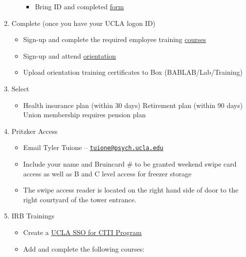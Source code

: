 \documentclass[]{book}
\providecommand{\tightlist}{%
  \setlength{\itemsep}{0pt}\setlength{\parskip}{0pt}}
\begin{document}
\begin{enumerate}
\begin{itemize}
    \begin{itemize}
    \tightlist
    \item
      Bring ID and completed \href{https://secure.bruincard.ucla.edu/BCW/BruinCard_Web/Docs/BC\%20Terms\%20\%20Signature\%2006.pdf}{form}
    \end{itemize}
  \end{itemize}
\item
  Complete (once you have your UCLA logon ID)

  \begin{itemize}
  \tightlist
  \item
    Sign-up and complete the required employee training \href{https://ucla.app.box.com/s/mizhokn39tq7z6odvnvutvaoko11n823}{courses}
  \item
    Sign-up and attend \href{https://www.chr.ucla.edu/training-and-development/new-employee-orientation}{orientation}
  \item
    Upload orientation training certificates to Box (BABLAB/Lab/Training)
  \end{itemize}
\item
  Select

  \begin{itemize}
  \tightlist
  \item
    Health insurance plan (within 30 days)
    Retirement plan (within 90 days)
    Union membership requires pension plan
  \end{itemize}
\item
  Pritzker Access

  \begin{itemize}
  \tightlist
  \item
    Email Tyler Tuione -- \href{mailto:tuione@psych.ucla.edu}{\nolinkurl{tuione@psych.ucla.edu}}
  \item
    Include your name and Bruincard \# to be granted weekend swipe card access as well as B and C level access for freezer storage
  \item
    The swipe access reader is located on the right hand side of door to the right courtyard of the tower entrance.
  \end{itemize}
\item
  IRB Trainings

  \begin{itemize}
  \tightlist
  \item
    Create a \href{http://ora.research.ucla.edu/OHRPP/Documents/Education/SSO_CITI_New_Acct.pdf}{UCLA SSO for CITI Program}
  \item
    Add and complete the following courses:


\end{itemize}
\end{enumerate}
\end{document}
